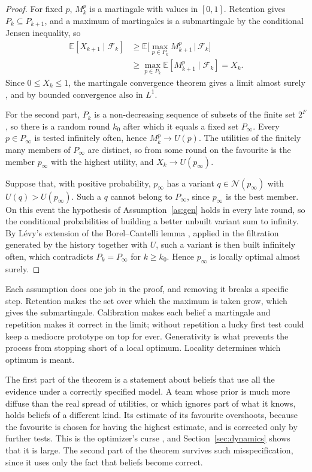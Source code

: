 \documentclass[10pt,twocolumn]{article}
\newcommand{\E}{\mathbb{E}}
\newcommand{\filt}{\mathcal{F}}
\newcommand{\Nb}{\mathcal{N}}
\newcommand{\Pk}{P_k}
\theoremstyle{definition}
\begin{document}
\begin{proof}
For fixed $p$, $M^p_k$ is a martingale with values in $[0,1]$. Retention gives $\Pk\subseteq P_{k+1}$, and a maximum of martingales is a submartingale by the conditional Jensen inequality, so
\begin{align*}
\E[X_{k+1}\mid\filt_k]&\ge\E\Big[\max_{p\in \Pk}M^p_{k+1}\,\Big|\,\filt_k\Big]\\
&\ge\max_{p\in \Pk}\E[M^p_{k+1}\mid\filt_k]=X_k .
\end{align*}
Since $0\le X_k\le1$, the martingale convergence theorem gives a limit almost surely \citep[Sec.~4.2]{durrett2019}, and by bounded convergence also in $L^1$.

For the second part, $\Pk$ is a non-decreasing sequence of subsets of the finite set $2^F$, so there is a random round $k_0$ after which it equals a fixed set $P_\infty$. Every $p\in P_\infty$ is tested infinitely often, hence $M^p_k\to U(p)$. The utilities of the finitely many members of $P_\infty$ are distinct, so from some round on the favourite is the member $p_\infty$ with the highest utility, and $X_k\to U(p_\infty)$.

Suppose that, with positive probability, $p_\infty$ has a variant $q\in\Nb(p_\infty)$ with $U(q)>U(p_\infty)$. Such a $q$ cannot belong to $P_\infty$, since $p_\infty$ is the best member. On this event the hypothesis of Assumption~\ref{as:gen} holds in every late round, so the conditional probabilities of building a better unbuilt variant sum to infinity. By L\'evy's extension of the Borel--Cantelli lemma \citep[Sec.~4.3]{durrett2019}, applied in the filtration generated by the history together with $U$, such a variant is then built infinitely often, which contradicts $\Pk=P_\infty$ for $k\ge k_0$. Hence $p_\infty$ is locally optimal almost surely.
\end{proof}

Each assumption does one job in the proof, and removing it breaks a specific step. Retention makes the set over which the maximum is taken grow, which gives the submartingale. Calibration makes each belief a martingale and repetition makes it correct in the limit; without repetition a lucky first test could keep a mediocre prototype on top for ever. Generativity is what prevents the process from stopping short of a local optimum. Locality determines which optimum is meant.

The first part of the theorem is a statement about beliefs that use all the evidence under a correctly specified model. A team whose prior is much more diffuse than the real spread of utilities, or which ignores part of what it knows, holds beliefs of a different kind. Its estimate of its favourite overshoots, because the favourite is chosen for having the highest estimate, and is corrected only by further tests. This is the optimizer's curse \citep{smithwinkler2006}, and Section~\ref{sec:dynamics} shows that it is large. The second part of the theorem survives such misspecification, since it uses only the fact that beliefs become correct.
\end{document}
